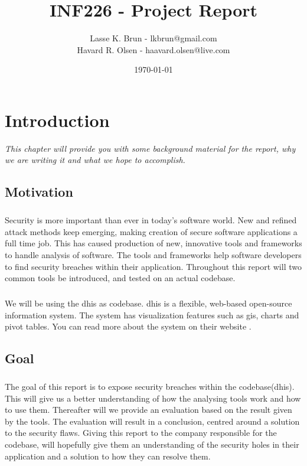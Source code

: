 \documentclass[11pt,english,a4paper]{report}
\title{INF226 - Project Report}
\date{\today}
\author{Lasse K. Brun - lkbrun@gmail.com \\ Havard R. Olsen - haavard.olsen@live.com}
\begin{document}
\maketitle

\tableofcontents
\newpage

\listoffigures
\newpage

\printglossaries
\newpage


\chapter{Introduction}
\textit{This chapter will provide you with some background material for the report, why we are writing it and what we hope to accomplish.}

\section{Motivation}
\paragraph{}
Security is more important than ever in today's software world. 
New and refined attack methods keep emerging, making creation of secure software applications a full time job. 
This has caused production of new, innovative tools and frameworks to handle analysis of software. 
The tools and frameworks help software developers to find security breaches within their application. 
Throughout this report will two common tools be introduced, and tested on an actual codebase.

\paragraph{}
We will be using the \gls{dhis} as codebase. \gls{dhis} is a flexible, web-based open-source information system. 
The system has visualization features such as \gls{gis}, charts and pivot tables. You can read more about the system on their website \cite{dhis2-homepage}.


\section{Goal}
\paragraph{}
The goal of this report is to expose security breaches within the codebase(\gls{dhis}). 
This will give us a better understanding of how the analysing tools work and how to use them. 
Thereafter will we provide an evaluation based on the result given by the tools. 
The evaluation will result in a conclusion, centred around a solution to the security flaws. 
Giving this report to the company responsible for the codebase, will hopefully give them an understanding of the security holes in their application and a solution to how they can resolve them.
\end{document}
